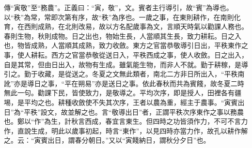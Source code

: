 {\noindent\zhuan{}\fzbyks 傳“寅敬”至“務農”。正義曰：“寅，敬”，文。賓者主行導引，故“賓”為導也。以“秩”為常，常即次第有序，故“秩”為序也。一歲之事，在東則耕作，在南則化育，在西則成熟，在北則改易，故以方名配歲事為文，言順天時氣以勸課人務也。春則生物，秋則成物。日之出也，物始生長，人當順其生長，致力耕耘。日之入也，物皆成熟，人當順其成熟，致力收斂。東方之官當恭敬導引日出，平秩東作之事，使人耕耘。西方之官當恭敬從送日入，平秩西成之事，使人收斂。日之出入，自是其常，但由日出入，故物有生成。雖氣能生物，而非人不就。勤于耕稼，是導引之。勤于收藏，是從送之。冬夏之文無此類者，南北二方非日所出入，“平秩南訛”亦是導日之事，“平在朔易”亦是送日之事。依此春秋而共為賓餞，故冬夏二時無此一句。勸課下民，皆使致力，是敬導之。平均次序，即是授人，田裡各有疆埸，是平均之也。耕種收斂使不失其次序，王者以農為重，經主于農事。“寅賓出日”為“平秩”設文，故並解之也。言“敬導出日”者，正謂平秩次序東作之事以務農也。鄭以“作”為生，計秋言西成，春宜言東生。但四時之功皆須作力，不可不言力作，直說生成，明此以歲事初起，時言“東作”，以見四時亦當力作，故孔以耕作解之。云：“寅賓出日，謂春分朝日。”又以“寅餞納日，謂秋分夕日”也。 \par}

